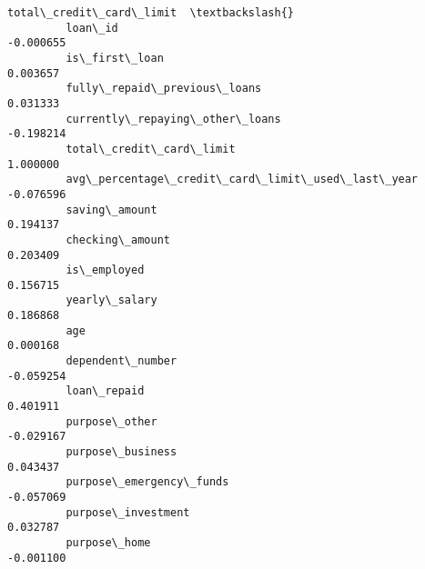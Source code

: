 \documentclass{report}
\begin{document}
\begin{Verbatim}[commandchars=\\\{\}]
                                                          total\_credit\_card\_limit  \textbackslash{}
         loan\_id                                                        -0.000655   
         is\_first\_loan                                                   0.003657   
         fully\_repaid\_previous\_loans                                     0.031333   
         currently\_repaying\_other\_loans                                 -0.198214   
         total\_credit\_card\_limit                                         1.000000   
         avg\_percentage\_credit\_card\_limit\_used\_last\_year                -0.076596   
         saving\_amount                                                   0.194137   
         checking\_amount                                                 0.203409   
         is\_employed                                                     0.156715   
         yearly\_salary                                                   0.186868   
         age                                                             0.000168   
         dependent\_number                                               -0.059254   
         loan\_repaid                                                     0.401911   
         purpose\_other                                                  -0.029167   
         purpose\_business                                                0.043437   
         purpose\_emergency\_funds                                        -0.057069   
         purpose\_investment                                              0.032787   
         purpose\_home                                                   -0.001100   
         

\end{Verbatim}
\end{document}
